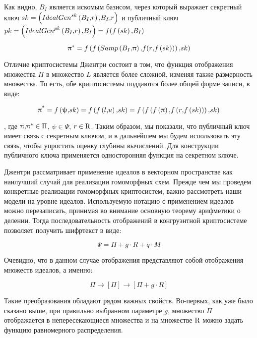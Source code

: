     
    Как видно, $B_I$ является искомым базисом, через который выражает секретный ключ $sk=\left({IdealGen}^{sk}\left(B_I \textrm{,} r\right) \textrm{,} B_I \textrm{,} r\right)$ и публичный ключ $pk=\left({IdealGen}^{pk}\left(B_I \textrm{,} r\right) \textrm{,} B_I\right)=f(f\left(sk\right) \textrm{,} B_I)$\textit{}
    
    \[{\uppi }^*=f\left(f\left(Samp\left(B_I \textrm{,} \uppi \right) \textrm{,} f(r \textrm{,} f\left(sk\right))\right) \textrm{,} sk\right)\] 
    
    Отличие криптосистемы Джентри состоит в том, что функция отображения множества $\Pi $ в множество $L$ является более сложной, изменяя также размерность множества. То есть, обе криптосистемы поддаются более общей форме записи, в виде:
    
    \[{\uppi }^{{\textrm *}}=f\left(\uppsi  \textrm{,} sk\right)=f\left(f\left(l \textrm{,} u\right) \textrm{,} sk\right)=f\left(f\left(f\left(\uppi \right) \textrm{,} f\left(r \textrm{,} f\left(sk\right)\right)\right) \textrm{,} sk\right)\] 
    
    , где $\uppi \textrm{,} {\uppi}^*\in \Pi $, $\psi \in \Psi $, $r\in {\textrm R}$. Таким образом, мы показали, что публичный ключ имеет связь с секретным ключом, и в дальнейшем мы будем использовать эту связь, чтобы упростить оценку глубины вычислений. Для конструкции публичного ключа применяется односторонняя функция на секретном ключе.
    
    Джентри рассматривает применение идеалов в векторном пространстве как наилучший случай для реализации гомоморфных схем. Прежде чем мы проведем конкретные реализации гомоморфных криптосистем, важно рассмотреть наши модели на уровне идеалов. Используемую нотацию с применением идеалов можно перезаписать, принимая во внимание основную теорему арифметики о делении. Тогда последовательность отображений в конгруэнтной криптосистеме позволяет получить шифртекст в виде:
    
    \[\Psi =\Pi +g\cdot R+q\cdot M\] 
    
    Очевидно, что в данном случае отображения представляют собой отображения множеств идеалов, а именно:
    
    \[\Pi \to \left[\Pi \right]\to [\Pi +g\cdot R]\] 
    
    Такие преобразования обладают рядом важных свойств. Во-первых, как уже было сказано выше, при правильно выбранном параметре $g$, множество $\Pi $ отображается в непересекающиеся множества и на множестве ${\textrm R}$ можно задать функцию равномерного распределения.
    
